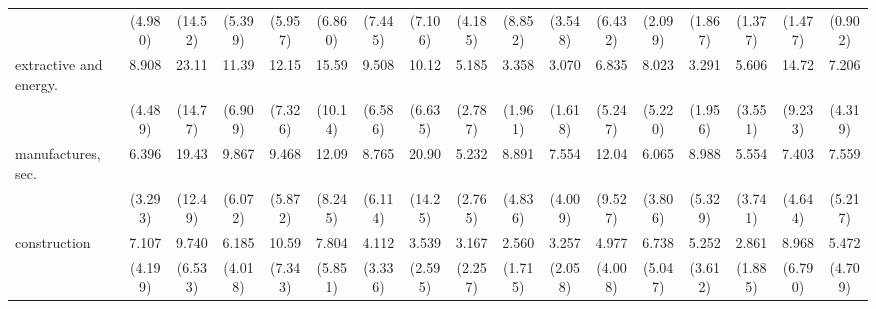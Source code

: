 {\begin{tabular}{l*{16}{c}}
                    &     (4.980)         &     (14.52)         &     (5.399)         &     (5.957)         &     (6.860)         &     (7.445)         &     (7.106)         &     (4.185)         &     (8.852)         &     (3.548)         &     (6.432)         &     (2.099)         &     (1.867)         &     (1.377)         &     (1.477)         &     (0.902)         \\
[1em]
extractive and energy.&       8.908\sym{***}&       23.11\sym{***}&       11.39\sym{***}&       12.15\sym{***}&       15.59\sym{***}&       9.508\sym{**} &       10.12\sym{***}&       5.185\sym{**} &       3.358\sym{*}  &       3.070\sym{*}  &       6.835\sym{*}  &       8.023\sym{**} &       3.291\sym{*}  &       5.606\sym{**} &       14.72\sym{***}&       7.206\sym{***}\\
                    &     (4.489)         &     (14.77)         &     (6.909)         &     (7.326)         &     (10.14)         &     (6.586)         &     (6.635)         &     (2.787)         &     (1.961)         &     (1.618)         &     (5.247)         &     (5.220)         &     (1.956)         &     (3.551)         &     (9.233)         &     (4.319)         \\
[1em]
manufactures, sec.  &       6.396\sym{***}&       19.43\sym{***}&       9.867\sym{***}&       9.468\sym{***}&       12.09\sym{***}&       8.765\sym{**} &       20.90\sym{***}&       5.232\sym{**} &       8.891\sym{***}&       7.554\sym{***}&       12.04\sym{**} &       6.065\sym{**} &       8.988\sym{***}&       5.554\sym{*}  &       7.403\sym{**} &       7.559\sym{**} \\
                    &     (3.293)         &     (12.49)         &     (6.072)         &     (5.872)         &     (8.245)         &     (6.114)         &     (14.25)         &     (2.765)         &     (4.836)         &     (4.009)         &     (9.527)         &     (3.806)         &     (5.329)         &     (3.741)         &     (4.644)         &     (5.217)         \\
[1em]
construction        &       7.107\sym{***}&       9.740\sym{***}&       6.185\sym{**} &       10.59\sym{***}&       7.804\sym{**} &       4.112         &       3.539         &       3.167         &       2.560         &       3.257         &       4.977\sym{*}  &       6.738\sym{*}  &       5.252\sym{*}  &       2.861         &       8.968\sym{**} &       5.472\sym{*}  \\
                    &     (4.199)         &     (6.533)         &     (4.018)         &     (7.343)         &     (5.851)         &     (3.336)         &     (2.595)         &     (2.257)         &     (1.715)         &     (2.058)         &     (4.008)         &     (5.047)         &     (3.612)         &     (1.885)         &     (6.790)         &     (4.709)         \\

\end{tabular}}
